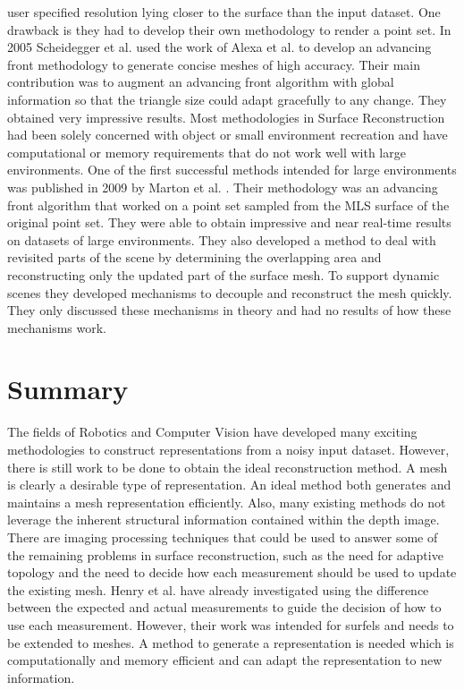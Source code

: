 user specified resolution lying closer to the surface than the input dataset.
One drawback is they had to develop their own methodology to render a point set.
In 2005 Scheidegger et al. used the work of Alexa et al. to develop an advancing
front methodology to generate concise meshes of high accuracy. Their main
contribution was to augment an advancing front algorithm with global information
so that the triangle size could adapt gracefully to any change. They obtained
very impressive results. Most methodologies in Surface Reconstruction had been
solely concerned with object or small environment recreation and have
computational or memory requirements that do not work well with large
environments. One of the first successful methods intended for large
environments was published in 2009 by Marton et al. \cite{Marton2009}. Their
methodology was an advancing front algorithm that worked on a point set sampled from the MLS surface of the original point set. They were able to
obtain impressive and near real-time results on datasets of large environments.
They also developed a method to deal with revisited parts of the scene by
determining the overlapping area and reconstructing only the updated part of the
surface mesh. To support dynamic scenes they developed mechanisms to decouple
and reconstruct the mesh quickly. They only discussed these mechanisms in theory
and had no results of how these mechanisms work.

\section{Summary}

The fields of Robotics and Computer Vision have developed many exciting
methodologies to construct representations from a noisy input dataset. However,
there is still work to be done to obtain the ideal reconstruction method. A mesh
is clearly a desirable type of representation. An ideal method both
generates and maintains a mesh representation efficiently. Also, many existing
methods do not leverage the inherent structural information contained within the
depth image. There are imaging processing techniques that could be used to
answer some of the remaining problems in surface reconstruction, such as the
need for adaptive topology and the need to decide how each measurement should be
used to update the existing mesh. Henry et al. \cite{Henry2012} have already
investigated using the difference between the expected and actual measurements
to guide the decision of how to use each measurement. However, their work was
intended for surfels and needs to be extended to meshes. A method to generate a
representation is needed which is computationally and memory efficient and can
adapt the representation to new information.
